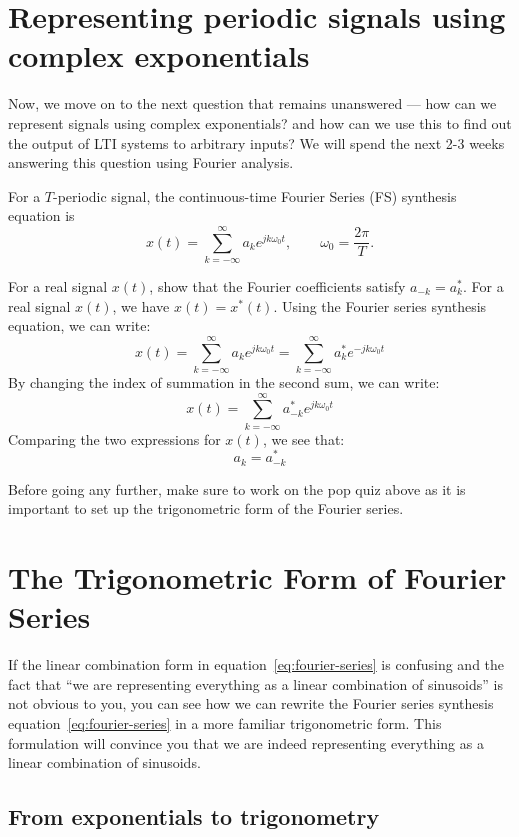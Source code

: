 \section{Representing periodic signals using complex exponentials}
Now, we move on to the next question that remains unanswered --- how can we represent signals using complex exponentials? and how can we use this to find out the output of LTI systems to arbitrary inputs? We will spend the next 2-3 weeks answering this question using Fourier analysis.

For a $T$-periodic signal, the continuous-time Fourier Series (FS) synthesis equation is
\begin{equation}
x(t)=\sum_{k=-\infty}^{\infty}a_k e^{jk\omega_0t},
\qquad \omega_0=\frac{2\pi}{T}.
\label{eq:fourier-series}
\end{equation}

\begin{popquiz}
  For a real signal $x(t)$, show that the Fourier coefficients satisfy $a_{-k}=a_k^\ast$.
\popqsplit
  For a real signal $x(t)$, we have $x(t) = x^\ast(t)$. Using the Fourier series synthesis equation, we can write:
  \[
  x(t) = \sum_{k=-\infty}^{\infty} a_k e^{jk\omega_0t} = \sum_{k=-\infty}^{\infty} a_k^\ast e^{-jk\omega_0t}
  \]
  By changing the index of summation in the second sum, we can write:
  \[
  x(t) = \sum_{k=-\infty}^{\infty} a_{-k}^\ast e^{jk\omega_0t}
  \]
  Comparing the two expressions for $x(t)$, we see that:
  \[
  a_k = a_{-k}^\ast
  \]
\end{popquiz}
Before going any further, make sure to work on the pop quiz above as it is important to set up the trigonometric form of the Fourier series. 
\section{The Trigonometric Form of Fourier Series}
If the linear combination form in equation~\eqref{eq:fourier-series} is confusing and the fact that ``we are representing everything as a linear combination of sinusoids'' is not obvious to you, you can see how we can rewrite the Fourier series synthesis equation~\eqref{eq:fourier-series} in a more familiar trigonometric form. This formulation will convince you that we are indeed representing everything as a linear combination of sinusoids.
\subsection{From exponentials to trigonometry}

